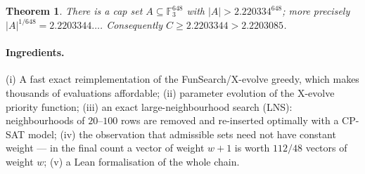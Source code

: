 \documentclass[11pt]{article}
\numberwithin{equation}{section}
\newtheorem{theorem}{Theorem}[section]
\theoremstyle{definition}
\theoremstyle{remark}
\newcommand{\F}{\mathbb F}
\newcommand{\NBOUND}{2.2203344}
\newcommand{\NLEAN}{2.220334}
\begin{document}
\begin{theorem}\label{thm:main}
There is a cap set $A\subseteq \F_3^{648}$ with $|A|>\NLEAN^{648}$; more precisely
$|A|^{1/648}=\NBOUND\ldots$.  Consequently $C\ge\NBOUND>2.2203085$.
\end{theorem}

\paragraph{Ingredients.}  (i) A fast exact reimplementation of the FunSearch/X-evolve greedy, which
makes thousands of evaluations affordable; (ii) parameter evolution of the X-evolve priority function;
(iii) an exact large-neighbourhood search (LNS): neighbourhoods of $20$--$100$ rows are removed and
re-inserted optimally with a CP-SAT model; (iv) the observation that admissible sets need not have
constant weight --- in the final count a vector of weight $w+1$ is worth $112/48$ vectors of weight
$w$; (v) a Lean formalisation of the whole chain.
\end{document}
